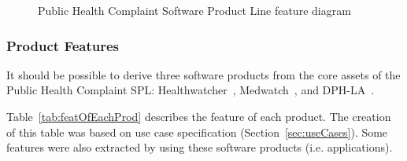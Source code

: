 \documentclass[11pt,twoside]{article}
\begin{document}
\begin{figure}[!h!t!b]
   \centering
{}
   \caption{Public Health Complaint Software Product Line feature diagram}
   \label{fig:featureDiag}
\end{figure}



\subsubsection{Product Features}
\label{sec:productfeat}
It should be possible to derive three software products from the core assets of the Public Health Complaint SPL:
Healthwatcher~\cite{hw-tao},
Medwatch~\cite{medwatch}, and DPH-LA~\cite{dphla}.

Table~\ref{tab:featOfEachProd} describes the feature of each product. The creation of this table was based on use case
specification (Section~\ref{sec:useCases}). Some features were also extracted by using these software products (i.e. applications).
\end{document}
